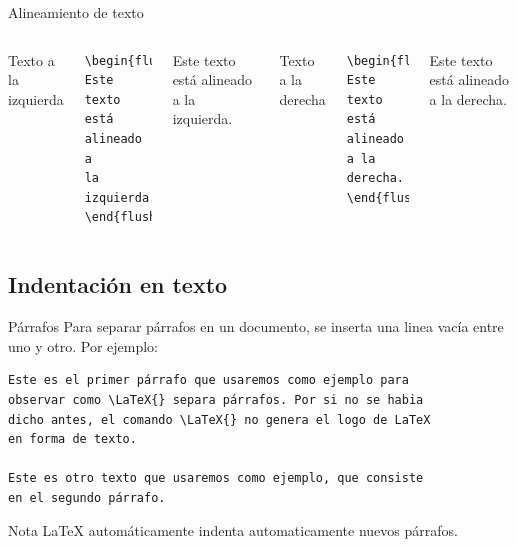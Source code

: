 \documentclass[../slides.tex]{subfiles}
\begin{document}
        \begin{frame}[fragile]{Alineamiento de texto}
        \begin{columns}
                Texto a la izquierda
                    \begin{verbatim}
\begin{flushleft}
Este texto está alineado a
la izquierda.
\end{flushleft}
                    \end{verbatim}
\begin{flushleft}
Este texto está alineado a la izquierda.
\end{flushleft}
                Texto a la derecha
                    \begin{verbatim}
\begin{flushright}
Este texto está alineado
a la derecha.
\end{flushright}
                    \end{verbatim}
\begin{flushright}
Este texto está alineado a la derecha.
\end{flushright}
        \end{columns}
    \end{frame}

    \subsection{Indentación en texto}
    
    \begin{frame}[fragile]{Párrafos}
        Para separar párrafos en un documento, se inserta una linea vacía entre uno y otro. Por ejemplo:
        \begin{verbatim}
Este es el primer párrafo que usaremos como ejemplo para 
observar como \LaTeX{} separa párrafos. Por si no se habia
dicho antes, el comando \LaTeX{} no genera el logo de LaTeX
en forma de texto.

Este es otro texto que usaremos como ejemplo, que consiste
en el segundo párrafo.
        \end{verbatim}
        \begin{block}{Nota}
        \LaTeX{} automáticamente indenta automaticamente nuevos párrafos. 
        \end{block}
    
    \end{frame}
    
\end{document}
